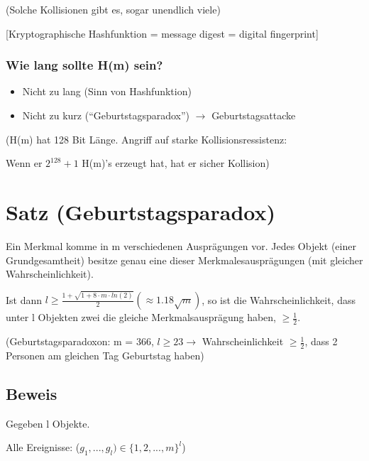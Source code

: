   (Solche Kollisionen gibt es, sogar unendlich viele)

  \par \medskip

  [Kryptographische Hashfunktion = message digest = digital fingerprint]

  \par \medskip

  \par \medskip

  \subsubsection*{Wie lang sollte H(m) sein?}

  \begin{itemize}
    \item Nicht zu lang (Sinn von Hashfunktion)
    \item Nicht zu kurz (``Geburtstagsparadox'') $\rightarrow$ Geburtstagsattacke
  \end{itemize}

  (H(m) hat 128 Bit Länge. Angriff auf starke Kollisionsressistenz:

  Wenn er $2^{128} +1$ H(m)'s erzeugt hat, hat er sicher Kollision)

  \section{Satz (Geburtstagsparadox)}

  Ein Merkmal komme in m verschiedenen Ausprägungen vor. Jedes Objekt (einer Grundgesamtheit) besitze genau eine dieser Merkmalesausprägungen (mit gleicher Wahrscheinlichkeit).

  \par \medskip

  Ist dann $l \ge \frac{1+ \sqrt{1+8 \cdot m \cdot ln(2)}}{2} (\approx 1.18 \sqrt{m})$, so ist die Wahrscheinlichkeit, dass unter l Objekten zwei die gleiche Merkmalsausprägung haben, $\ge \frac{1}{2}$.

  (Geburtstagsparadoxon: m = 366, $l \ge 23 \rightarrow$ Wahrscheinlichkeit $\ge \frac{1}{2}$, dass 2 Personen am gleichen Tag Geburtstag haben)

  \subsection{Beweis}

  Gegeben l Objekte.

  Alle Ereignisse: ($g_1, ..., g_l) \in \{1,2,...,m\}^l$)

